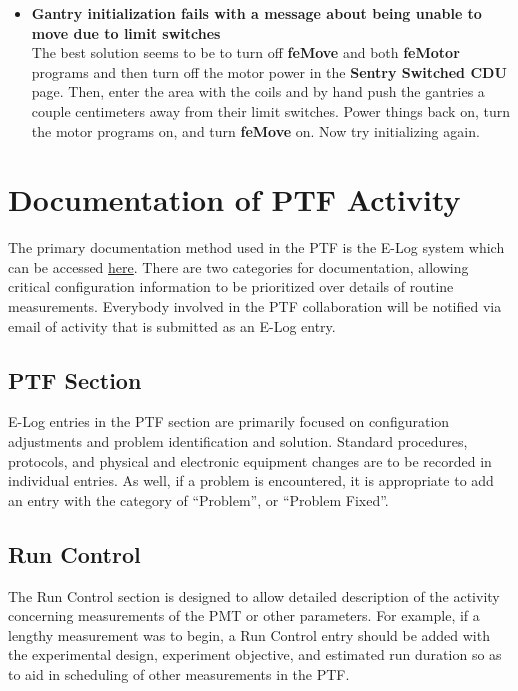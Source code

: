 \documentclass[twoside,letterpaper]{refart}
\begin{document}
\begin{itemize}
	\item \textbf{Gantry initialization fails with a message about being unable to move due to limit switches}\\
	The best solution seems to be to turn off \textbf{feMove} and both \textbf{feMotor} programs and then turn off the motor power in the \textbf{Sentry Switched CDU} page. Then, enter the area with the coils and by hand push the gantries a couple centimeters away from their limit switches. Power things back on, turn the motor programs on, and turn \textbf{feMove} on. Now try initializing again.

\end{itemize}



\clearpage
\section{Documentation of PTF Activity}

The primary documentation method used in the PTF is the E-Log system which can be accessed \href{https://midptf01.triumf.ca/elog/}{here}. There are two categories for documentation, allowing critical configuration information to be prioritized over details of routine measurements. Everybody involved in the PTF collaboration will be notified via email of activity that is submitted as an E-Log entry.

\subsection{PTF Section}

E-Log entries in the PTF section are primarily focused on configuration adjustments and problem identification and solution. Standard procedures, protocols, and physical and electronic equipment changes are to be recorded in individual entries. As well, if a problem is encountered, it is appropriate to add an entry with the category of ``Problem'', or ``Problem Fixed''.

\subsection{Run Control}

The Run Control section is designed to allow detailed description of the activity concerning measurements of the PMT or other parameters. For example, if a lengthy measurement was to begin, a Run Control entry should be added with the experimental design, experiment objective, and estimated run duration so as to aid in scheduling of other measurements in the PTF.
\end{document}
